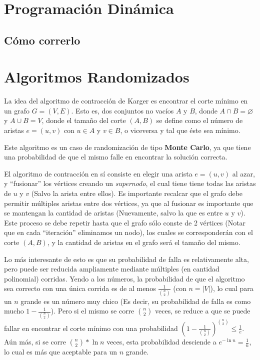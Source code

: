 \documentclass[a4paper,10pt]{article}
\begin{document}
\maketitle
\thispagestyle{empty}

\pagebreak 

\tableofcontents
\pagebreak

\clearpage
\section{Programación Dinámica}


\subsection{Cómo correrlo}


\section{Algoritmos Randomizados}
La idea del algoritmo de contracción de Karger es encontrar el corte mínimo en un grafo $G=(V,E)$. Esto es, dos conjuntos no vacíos $A$ y $B$, donde $A \cap B = \varnothing$ y $A \cup B = V$, donde el tamaño del corte $(A,B)$ se define como el número de aristas $e = (u,v)$ con $u \in A$ y $v \in B$, o viceversa y tal que éste sea mínimo.

Este algoritmo es un caso de randomización de tipo \textbf{Monte Carlo}, ya que tiene una probabilidad de que el mismo falle en encontrar la solución correcta.

El algoritmo de contracción en sí consiste en elegir una arista $e=(u,v)$ al azar, y “fusionar” los vértices creando un \textit{supernodo}, el cual tiene tiene todas las aristas de $u$ y $v$ (Salvo la arista entre ellos). Es importante recalcar que el grafo debe permitir múltiples aristas entre dos vértices, ya que al fusionar es importante que se mantengan la cantidad de aristas (Nuevamente, salvo la que es entre $u$ y $v$). Este proceso se debe repetir hasta que el grafo sólo conste de 2 vértices (Notar que en cada ``iteración'' eliminamos un nodo), los cuales se corresponderán con el corte $(A,B)$, y la cantidad de aristas en el grafo será el tamaño del mismo.

Lo más interesante de esto es que su probabilidad de falla es relativamente alta, pero puede ser reducida ampliamente mediante múltiples (en cantidad polinomial) corridas. Yendo a los números, la probabilidad de que el algoritmo sea correcto con una única corrida es de al menos $\frac{1}{\binom{n}{2}}$ (con $n = |V|$), lo cual para un $n$ grande es un número muy chico (Es decir, su probabilidad de falla es como mucho $1 - \frac{1}{\binom{n}{2}}$). Pero si el mismo se corre $\binom{n}{2}$ veces, se reduce a que se puede fallar en encontrar el corte mínimo con una probabilidad $(1 - \frac{1}{\binom{n}{2}})^{\binom{n}{2}} \leq \frac{1}{e}$. Aún más, si se corre $\binom{n}{2}*\ln n$ veces, esta probabilidad desciende a $e^{-\ln n} = \frac{1}{n}$, lo cual es más que aceptable para un $n$ grande.
\end{document}
